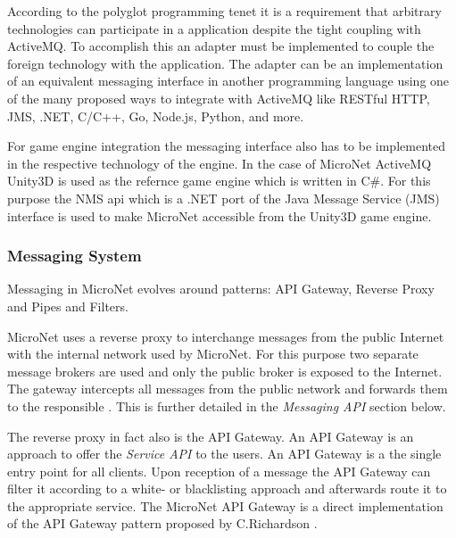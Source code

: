 According to the polyglot programming tenet it is a requirement that arbitrary
technologies can participate in a \ms{} application despite the tight coupling
with ActiveMQ. To accomplish this an adapter must be implemented to couple the
foreign technology with the application. The adapter can be an
implementation of an equivalent messaging interface in another programming
language using one of the many proposed ways to integrate with ActiveMQ like
RESTful HTTP, JMS, .NET, C/C++, Go, Node.js, Python, and more.

For game engine integration the messaging interface also has to be implemented
in the respective technology of the engine. In the case of MicroNet ActiveMQ
Unity3D is used as the refernce game engine which is written in C\#. For this
purpose the NMS \gls{api} which is a .NET port of the Java Message Service (JMS)
interface is used to make MicroNet accessible from the Unity3D game engine.

\subsubsection{Messaging System}

Messaging in MicroNet evolves around patterns: API Gateway, Reverse Proxy and
Pipes and Filters.

MicroNet uses a reverse proxy to interchange messages from the public Internet
with the internal network used by MicroNet. For this purpose two separate
message brokers are used and only the public broker is exposed to the Internet.
The gateway intercepts all messages from the public network and forwards them to
the responsible \ms{}. This is further detailed in the \textit{Messaging API}
section below.

The reverse proxy in fact also is the API Gateway. An API Gateway is an approach
to offer the \textit{Service API} to the users. An API Gateway is a the single
entry point for all clients. Upon reception of a message the API Gateway can
filter it according to a white- or blacklisting approach and afterwards route it
to the appropriate service. The MicroNet API Gateway is a direct implementation
of the API Gateway pattern proposed by C.Richardson
\cite{richardson2017apigateway}.

